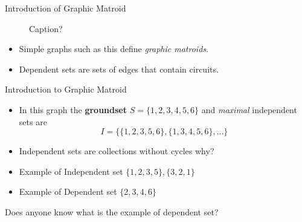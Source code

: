 \documentclass{beamer}
\begin{document}
\begin{frame}{Introduction of  Graphic Matroid}
\begin{figure}
\caption{Caption?}
\end{figure}
\begin{itemize}
    \item <1-> Simple graphs such as this define \textit{graphic matroids}.
    \item <2-> Dependent sets are sets of edges that contain circuits.
\end{itemize}
\end{frame}
\begin{frame}{Introduction to Graphic Matroid}
    
    \begin{itemize}
       \item In this graph the \textbf{groundset} $S =\{1,2,3,4,5,6\}$ and \textit{maximal} independent sets are
       \[
            I = \{\{1, 2, 3, 5, 6\}, \{1, 3, 4, 5, 6\}, ...\}
       \]
        \item Independent sets are collections without cycles why?
        \item Example of Independent set $\{1,2,3,5\} , \{3,2,1\}$
        \item Example of Dependent set $\{2,3,4,6\}$
        
    \end{itemize}
    Does anyone know what is the example of dependent set?

\end{frame}
\end{document}
